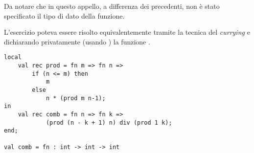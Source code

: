 Da notare che in questo appello, a differenza dei precedenti, non è stato specificato il tipo di dato della funzione.

L'esercizio poteva essere risolto equivalentemente tramite la tecnica del \emph{currying} e dichiarando privatamente (usando ) la funzione .

\begin{lstlisting}[float, style = SML, caption = {Definizione delle funzioni \sml{prod} e \sml{comb} con \sml{val rec}}]
local
	val rec prod = fn m => fn n =>
		if (n <= m) then
			m
		else
			n * (prod m n-1);
in
	val rec comb = fn n => fn k =>
			(prod (n - k + 1) n) div (prod 1 k);
end;

val comb = fn : int -> int -> int
\end{lstlisting}
